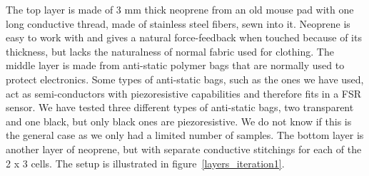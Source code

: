 The top layer is made of 3 mm thick neoprene from an old mouse pad with one long conductive thread, made of stainless steel fibers, sewn into it.
Neoprene is easy to work with and gives a natural force-feedback when touched because of its thickness, but lacks the naturalness of normal fabric used for clothing.
The middle layer is made from anti-static polymer bags that are normally used to protect electronics. 
Some types of anti-static bags, such as the ones we have used, act as semi-conductors with piezoresistive capabilities and therefore fits in a FSR sensor.
We have tested three different types of anti-static bags, two transparent and one black, but only black ones are piezoresistive.
We do not know if this is the general case as we only had a limited number of samples.
The bottom layer is another layer of neoprene, but with separate conductive stitchings for each of the 2 x 3 cells.
The setup is illustrated in figure~\ref{layers_iteration1}.

